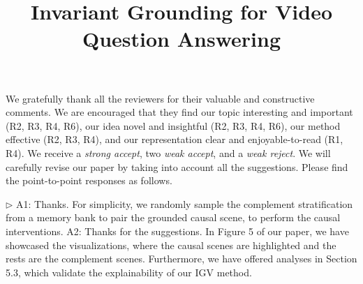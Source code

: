 \documentclass[10pt,twocolumn,letterpaper]{article}
\newcommand{\wx}[1]{{\color{green}{#1}}}
\newcommand{\blue}[1]{{\color{blue}{#1}}}
\newcommand{\pink}[1]{{\color{magenta}{#1}}}
\begin{document}
\title{Invariant Grounding for Video Question Answering}  %

\maketitle
\thispagestyle{empty}
\appendix


We gratefully thank all the reviewers for their valuable and constructive comments. We are encouraged that they find our topic interesting and important (R2, R3, R4, R6), our idea novel and insightful (R2, R3, R4, R6), our method effective (R2, R3, R4), and our representation clear and enjoyable-to-read (R1, R4). We receive a \emph{strong accept}, two \emph{weak accept}, and a \emph{weak reject}. We will carefully revise our paper by taking into account all the suggestions. Please find the point-to-point responses as follows.





\vspace{2pt}
\noindent
$\triangleright$\pink{Reviewer \#2.} \blue{Q1: The sampling strategy of complement stratification (\cf Line 457).}
A1: Thanks. For simplicity, we randomly sample the complement stratification from a memory bank to pair the grounded causal scene, to perform the causal interventions.
\blue{Q2: Visualization of causal and complement scenes predicted by Equation (9).}
A2: Thanks for the suggestions. In Figure 5 of our paper, we have showcased the visualizations, where the causal scenes are highlighted and the rests are the complement scenes. Furthermore, we have offered analyses in Section 5.3, which validate the explainability of our IGV method.
\end{document}

